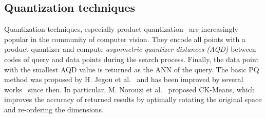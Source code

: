 \documentclass[twocolumn]{svjour3}          %
\begin{document}






\subsection{Quantization techniques}
Quantization techniques, especially product quantization~\cite{Jegou2011PQ,Norouzi2013} are increasingly popular in the community of computer vision. They encode all points with a product quantizer and compute \emph{asymmetric quantizer distances (AQD)} between codes of query and data points during the search process. Finally, the data point with the smallest AQD value is returned as the ANN of the query. The basic PQ method was proposed by H. Jegou et al.~\cite{Jegou2011PQ} and has been improved by several works~\cite{Babenko2012Inverted,Norouzi2013,WangWSXSL15,Yannis2014LOPQ} since then. In particular, M. Norouzi et al.~\cite{Norouzi2013} proposed CK-Means, which improves the accuracy of returned results by optimally rotating the original space and re-ordering the dimensions.
\end{document}
